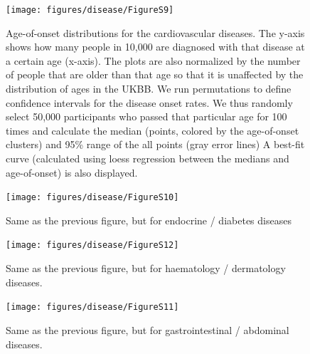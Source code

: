 \documentclass[12pt,twoside]{unicam}
\begin{document}
\begin{figure}

{\centering \texttt{[image: figures/disease/FigureS9]} 

}

\caption[Age-of-onset distributions for the cardiovascular diseases.]{Age-of-onset distributions for the cardiovascular diseases. The y-axis shows how many people in 10,000 are diagnosed with that disease at a certain age (x-axis). The plots are also normalized by the number of people that are older than that age so that it is unaffected by the distribution of ages in the UKBB. We run permutations to define confidence intervals for the disease onset rates. We thus randomly select 50,000 participants who passed that particular age for 100 times and calculate the median (points, colored by the age-of-onset clusters) and 95\% range of the all points (gray error lines) A best-fit curve (calculated using loess regression between the medians and age-of-onset) is also displayed.}\label{fig:disFigS9}
\end{figure}

\begin{figure}

{\centering \texttt{[image: figures/disease/FigureS10]} 

}

\caption[Age-of-onset distributions for the endocrine / diabetes diseases.]{Same as the previous figure, but for endocrine / diabetes diseases}\label{fig:disFigS10}
\end{figure}

\begin{figure}

{\centering \texttt{[image: figures/disease/FigureS12]} 

}

\caption[Age-of-onset distributions for the haematology / dermatology diseases.]{Same as the previous figure, but for haematology / dermatology diseases.}\label{fig:disFigS12}
\end{figure}

\begin{figure}

{\centering \texttt{[image: figures/disease/FigureS11]} 

}

\caption[Age-of-onset distributions for the gastrointestinal / abdominal diseases.]{Same as the previous figure, but for gastrointestinal / abdominal diseases.}\label{fig:disFigS11}
\end{figure}
\end{document}
